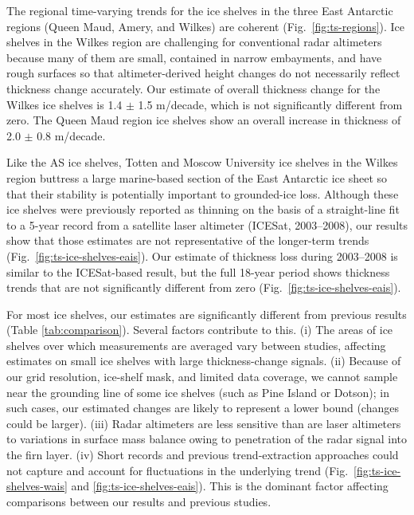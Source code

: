 The regional time-varying trends for the ice
shelves in the three East Antarctic regions (Queen
Maud, Amery, and Wilkes) are coherent (Fig.~\ref{fig:ts-regions}).
Ice shelves in the Wilkes region are challenging
for conventional radar altimeters because many
of them are small, contained in narrow embayments,
and have rough surfaces so that altimeter-derived
height changes do not necessarily reflect
thickness change accurately. Our estimate of overall
thickness change for the Wilkes ice shelves is
1.4 $\pm$ 1.5 m/decade, which is not significantly
different from zero. The Queen Maud region ice
shelves show an overall increase in thickness of
2.0 $\pm$ 0.8 m/decade.

Like the AS ice shelves, Totten and Moscow
University ice shelves in the Wilkes region buttress
a large marine-based section of the East
Antarctic ice sheet so that their stability is potentially
important to grounded-ice loss. Although
these ice shelves were previously reported as
thinning \parencite{Pritchard2012} on the basis of a straight-line fit to
a 5-year record from a satellite laser altimeter
(ICESat, 2003--2008), our results show that those
estimates are not representative of the longer-term
trends (Fig.~\ref{fig:ts-ice-shelves-eais}). Our estimate of thickness
loss during 2003--2008 is similar to the ICESat-based
result, but the full 18-year period shows
thickness trends that are not significantly different
from zero (Fig.~\ref{fig:ts-ice-shelves-eais}).

For most ice shelves, our estimates are significantly
different from previous results (Table \ref{tab:comparison}).
Several factors contribute to this. (i) The areas of
ice shelves over which measurements are averaged
vary between studies, affecting estimates on
small ice shelves with large thickness-change
signals. (ii) Because of our grid resolution, ice-shelf
mask, and limited data coverage, we cannot
sample near the grounding line of some ice shelves
(such as Pine Island or Dotson); in such cases,
our estimated changes are likely to represent a
lower bound (changes could be larger). (iii) Radar
altimeters are less sensitive than are laser altimeters
to variations in surface mass balance owing
to penetration of the radar signal into the firn
layer. (iv) Short records and previous trend-extraction
approaches could not capture and account
for fluctuations in the underlying trend (Fig.~\ref{fig:ts-ice-shelves-wais} and \ref{fig:ts-ice-shelves-eais}).
This is the dominant factor affecting comparisons
between our results and previous studies.

